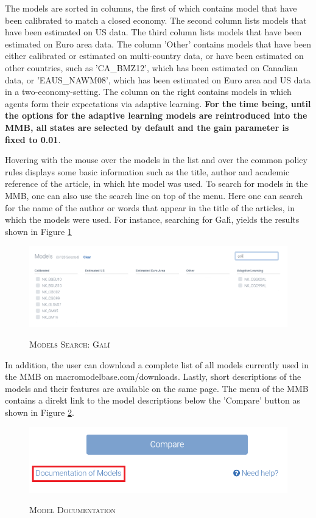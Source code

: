 The models are sorted in columns, the first of which contains model that have been calibrated to match a closed economy. The second column lists models that have been estimated on US data. The third column lists models that have been estimated on Euro area data. The column 'Other' contains models that have been either calibrated or estimated on multi-country data, or have been estimated on other countries, such as 'CA\_BMZ12', which has been estimated on Canadian data, or 'EAUS\_NAWM08', which has been estimated on Euro area and US data in a two-economy-setting. The column on the right contains models in which agents form their expectations via adaptive learning. \textbf{For the time being, until the options for the adaptive learning models are reintroduced into the MMB, all states are selected by default and the gain parameter is fixed to 0.01}. 


Hovering with the mouse over the models in the list and over the common policy rules displays some basic information such as the title, author and academic reference of the article, in which hte model was used. To search for models in the MMB, one can also use the search line on top of the menu. Here one can search for the name of the author or words that appear in the title of the articles, in which the models were used. For instance, searching for Gal{\'\i}, yields the results shown in Figure \ref{search}

\begin{figure}[H]
	\centering
	\caption{\textsc{Models Search: Gal{\'\i}}}
	\vspace{0.2cm}
	\includegraphics[width=15cm,keepaspectratio]{gali.png}\\
	\label{search}
\end{figure}

In addition, the user can download a complete list of all models currently used in the MMB on macromodelbase.com/downloads. Lastly, short descriptions of the models and their features are available on the same page. The menu of the MMB contains a direkt link to the model descriptions below the 'Compare' button as shown in Figure \ref{docmod}.
\begin{figure}[H]
	\centering
	\caption{\textsc{Model Documentation}}
	\vspace{0.2cm}
	\includegraphics[width=15cm,keepaspectratio]{documentmodels.png}\\
	\label{docmod}
\end{figure}


